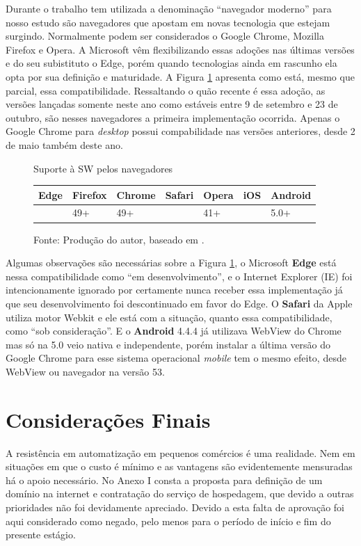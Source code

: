 \documentclass[
	12pt,
	openright,
	oneside, %
	a4paper,
	chapter=TITLE,
	section=TITLE,
	english,
	brazil %
	]{abntex2-udesc}
\begin{document}
Durante o trabalho tem utilizada a denominação ``navegador moderno'' para nosso estudo são navegadores que apostam em novas tecnologia que estejam surgindo. Normalmente podem ser considerados o Google Chrome, Mozilla Firefox e Opera. A Microsoft vêm flexibilizando essas adoções nas últimas versões e do seu subistituto o Edge, porém quando tecnologias ainda em rascunho ela opta por sua definição e maturidade. A Figura \ref{fig:swcompatibility} apresenta como está, mesmo que parcial, essa compatibilidade. Ressaltando o quão recente é essa adoção, as versões lançadas somente neste ano como estáveis entre 9 de setembro e 23 de outubro, são nesses navegadores a primeira implementação ocorrida. Apenas o Google Chrome para \textit{desktop} possui compabilidade nas versões anteriores, desde 2 de maio também deste ano.

\begin{figure}[h]
\centering
  \caption{Suporte à SW pelos navegadores}\label{fig:swcompatibility}
\begin{tabular}{ C{46pt} | C{46pt} | C{46pt} | C{46pt} | C{46pt} | C{46pt} | C{46pt} }\hline
Edge & Firefox & Chrome & Safari & Opera & iOS & Android \\ \hline
 & 49+ & 49+ &  & 41+ &  & 5.0+ \\ \hline
\end{tabular}
  \caption*{\footnotesize Fonte: Produção do autor, baseado em .}
\end{figure}

Algumas observações são necessárias sobre a Figura \ref{fig:swcompatibility}, o Microsoft \textbf{Edge} está nessa compatibilidade como ``em desenvolvimento'', e o Internet Explorer (IE) foi intencionamente ignorado por certamente nunca receber essa implementação já que seu desenvolvimento foi descontinuado em favor do Edge. O \textbf{Safari} da Apple utiliza motor Webkit e ele está com a situação, quanto essa compatibilidade, como ``sob consideração''. E o \textbf{Android} 4.4.4 já utilizava WebView do Chrome mas só na 5.0 veio nativa e independente, porém instalar a última versão do Google Chrome para esse sistema operacional \textit{mobile} tem o mesmo efeito, desde WebView ou navegador na versão 53.

\chapter{Considerações Finais}

A resistência em automatização em pequenos comércios é uma realidade. Nem em situações em que o custo é mínimo e as vantagens são evidentemente mensuradas há o apoio necessário.
No Anexo I consta a proposta para definição de um domínio na internet e contratação do serviço de hospedagem, que devido a outras prioridades não foi devidamente apreciado. Devido a esta falta de aprovação foi aqui considerado como negado, pelo menos para o período de início e fim do presente estágio.
\end{document}
